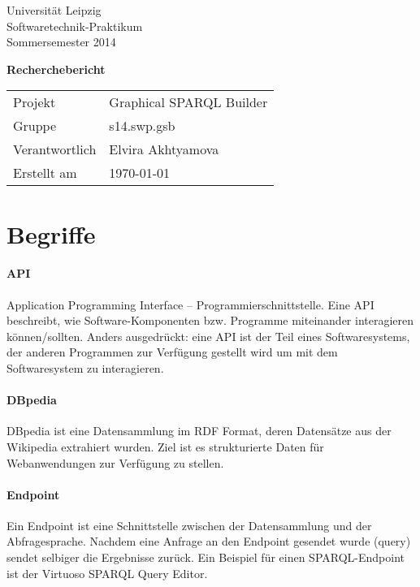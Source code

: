 \def\verantwortlicher{Elvira Akhtyamova} %
\thispagestyle{empty} 

\vspace*{2\baselineskip}

\begin{center}
\sffamily
Universität Leipzig\\
Softwaretechnik-Praktikum\\
Sommersemester 2014
\baselineskip

\bgroup
\Huge\textbf{Recherchebericht}
\egroup
{}\baselineskip

\begin{tabular}{ll}
Projekt & Graphical SPARQL Builder \\
Gruppe & s14.swp.gsb \\
Verantwortlich & \verantwortlicher\\
Erstellt am & \today \\
\end{tabular}
\end{center}

\vfill%

\tableofcontents

\pagebreak

\section{Begriffe}

\newcommand{\begriff}[2]{
\paragraph{#1}
#2
}


\begriff{API}
{Application Programming Interface -- Programmierschnittstelle.
Eine API beschreibt, wie Software-Komponenten bzw. Programme miteinander interagieren können/sollten. Anders ausgedrückt: eine API ist der Teil eines Softwaresystems, der anderen Programmen zur Verfügung gestellt wird um mit dem Softwaresystem zu interagieren.}

\begriff{DBpedia}
{DBpedia ist eine Datensammlung im RDF Format, deren Datensätze aus der Wikipedia extrahiert wurden. Ziel ist es strukturierte Daten für Webanwendungen zur Verfügung zu stellen.
\cite{dbpedia-wikipedia,dbpedia,dbpedia-datasets}
}

\begriff{Endpoint}
{Ein Endpoint ist eine Schnittstelle zwischen der Datensammlung und der 
Abfragesprache. Nachdem eine Anfrage an den Endpoint gesendet wurde (query)  sendet selbiger die Ergebnisse zurück. Ein Beispiel für einen SPARQL-Endpoint ist der \glqq Virtuoso SPARQL Query Editor\grqq . \cite{dbpedia-sparql}}

